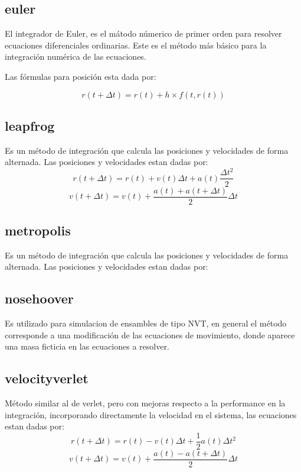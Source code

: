 \subsection{euler}
El integrador de Euler, es el m\'atodo n\'umerico de primer orden para resolver
ecuaciones diferenciales ordinarias. Este es el m\'etodo m\'as b\'asico para la
integraci\'on num\'erica de las ecuaciones.

Las f\'ormulas para posici\'on esta dada por:

$$r(t+\Delta t) = r(t) + h\times f(t,r(t))$$

\subsection{leapfrog}
Es un m\'etodo de integraci\'on que calcula las posiciones y velocidades de
forma alternada. Las posiciones y velocidades estan dadas por:
$$r(t+\Delta t) = r(t) + v(t)\Delta t + a(t)\frac{\Delta t^2}{2}$$
$$v(t+\Delta t) = v(t) + \frac{a(t)+a(t+\Delta t)}{2}\Delta t$$

\subsection{metropolis}
Es un m\'etodo de integraci\'on que calcula las posiciones y velocidades de
forma alternada. Las posiciones y velocidades estan dadas por:

\subsection{nosehoover}
Es utilizado para simulacion de ensambles de tipo NVT, en general el m\'etodo
corresponde a una modificaci\'on de las ecuaciones de movimiento, donde aparece
una masa ficticia en las ecuaciones a resolver.


\subsection{velocityverlet}
M\'etodo similar al de verlet, pero con mejoras respecto a la performance en la
integraci\'on, incorporando directamente la velocidad en el sistema, las
ecuaciones estan dadas por:
$$r(t+\Delta t) = r(t) - v(t)\Delta t + \frac{1}{2}a(t)\Delta t^2$$
$$v(t+\Delta t) = v(t) + \frac{a(t) - a(t + \Delta t)}{2}\Delta t$$

